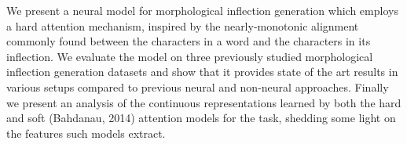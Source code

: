 We present a neural model for morphological inflection generation which employs a hard attention mechanism, inspired by the nearly-monotonic alignment commonly found between the characters in a word and the characters in its inflection. We evaluate the model on three previously studied morphological inflection generation datasets and show that it provides state of the art results in various setups compared to previous neural and non-neural approaches. Finally we present an analysis of the continuous representations learned by both the hard and soft (Bahdanau, 2014) attention models for the task, shedding some light on the features such models extract.
